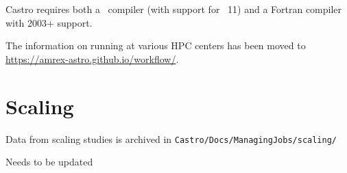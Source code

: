 

Castro requires both a \cpp\ compiler (with support for \cpp\ 11) and
a Fortran compiler with 2003+ support.

The information on running at various HPC centers has been moved to
\url{https://amrex-astro.github.io/workflow/}.

\section{Scaling}

Data from scaling studies is archived in {\tt Castro/Docs/ManagingJobs/scaling/}

Needs to be updated




